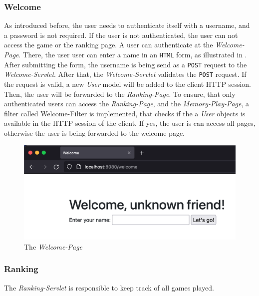 \subsubsection{Welcome}\label{subsubsec:03_impl_backend_welcome}
As introduced before, the user needs to authenticate itself with a username, and a password is not required. If the user is not authenticated, the user can not access the game or the ranking page.
A user can authenticate at the \textit{Welcome-Page}. There, the user user can enter a name in an \texttt{HTML} form, as illustrated in . After submitting the form, the username is being send as a \texttt{POST} request to the \textit{Welcome-Servlet}. After that, the \textit{Welcome-Servlet} validates the \texttt{POST} request. If the request is valid, a new \textit{User} model will be added to the client HTTP session. Then, the user will be forwarded to the \textit{Ranking-Page}.
To ensure, that only authenticated users can access the \textit{Ranking-Page}, and the \textit{Memory-Play-Page}, a filter called Welcome-Filter is implemented, that checks if the a \textit{User} objects is available in the HTTP session of the client. If yes, the user is can access all pages, otherwise the user is being forwarded to the welcome page.
\begin{figure}[h]
\centering
\includegraphics[scale=0.4]{images/03_impl/welcome/welcome-page}
\caption{The \textit{Welcome-Page}}
\label{fig:03_impl_backend_welcome_page}
\end{figure}

\subsubsection{Ranking}\label{subsubsec:03_impl_backend_ranking}
The \textit{Ranking-Servlet} is responsible to keep track of all games played.

